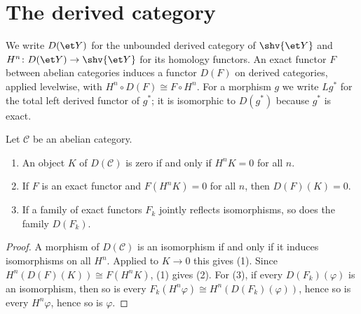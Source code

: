 \section{The derived category}\label{sec:openclosed-derived}

We write $D(\et Y)$ for the unbounded derived category of $\shv{\et Y}$ and
$H^n\colon D(\et Y)\to\shv{\et Y}$ for its homology functors.  An exact
functor $F$ between abelian categories induces a functor $D(F)$ on derived
categories, applied levelwise, with $H^n\circ D(F)\cong F\circ H^n$.  For a
morphism $g$ we write $Lg^*$ for the total left derived functor of $g^*$; it is
isomorphic to $D(g^*)$ because $g^*$ is exact.

\begin{lemma}
\label{lemma:openclosed-derived-exact-functor}
\leanok
Let $\mathcal C$ be an abelian category.
\begin{enumerate}
\item An object $K$ of $D(\mathcal C)$ is zero if and only if $H^nK=0$ for
      all $n$.
\item If $F$ is an exact functor and $F(H^nK)=0$ for all $n$, then
      $D(F)(K)=0$.
\item If a family of exact functors $F_k$ jointly reflects isomorphisms, so
      does the family $D(F_k)$.
\end{enumerate}
\end{lemma}
\begin{proof}
\leanok
A morphism of $D(\mathcal C)$ is an isomorphism if and only if it induces
isomorphisms on all $H^n$.  Applied to $K\to0$ this gives (1).  Since
$H^n(D(F)(K))\cong F(H^nK)$, (1) gives (2).  For (3), if every $D(F_k)(\varphi)$
is an isomorphism, then so is every $F_k(H^n\varphi)\cong H^n(D(F_k)(\varphi))$,
hence so is every $H^n\varphi$, hence so is $\varphi$.
\end{proof}

